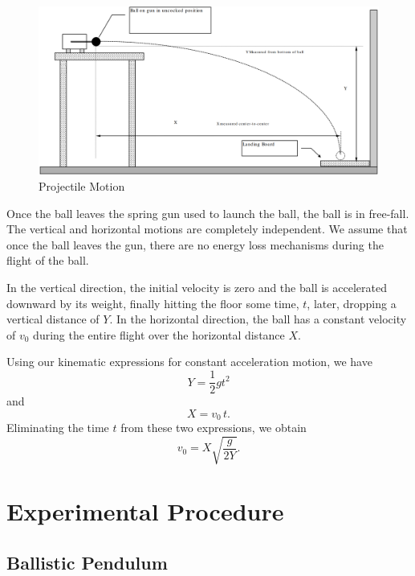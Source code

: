\begin{figure}
  \begin{center}
    \includegraphics[width=6in]{Fall/Experiment05Figures/M06_fig02.png}
  \end{center}
  \caption{Projectile Motion}
  \label{M06Fig02}
\end{figure}

Once the ball leaves the spring gun used to launch the ball, the ball is in free-fall.  The vertical and horizontal motions are completely independent.  We assume that once the ball leaves the gun, there are no energy loss mechanisms during the flight of the ball.

In the vertical direction, the initial velocity is zero and the ball is accelerated downward by its weight, finally hitting the floor some time, $t$, later, dropping a vertical distance of $Y$.
In the horizontal direction, the ball has a constant velocity of $v_0$ during the entire flight over the horizontal distance $X$.

Using our kinematic expressions for constant acceleration motion, we have
\[
Y = \frac{1}{2} g t^2
\]
and
\[
X = v_0 \, t.
\]
Eliminating the time $t$ from these two expressions, we obtain
\begin{equation}
  \label{eq:M06v0pro}
  v_0 = X \sqrt{\frac{g}{2 Y}}.
\end{equation}


\section{Experimental Procedure}

\subsection{Ballistic Pendulum}

